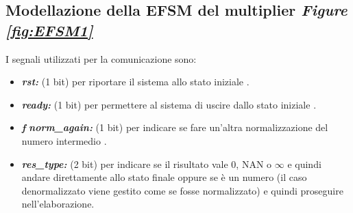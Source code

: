 \documentclass[]{IEEEtran}
\begin{document}
\subsection{Modellazione della EFSM del multiplier {\it Figure \ref{fig:EFSM1}}}
I segnali utilizzati per la comunicazione sono:
\begin{itemize}
    \item \textit{\textbf{rst:}} (1 bit) per riportare il sistema allo stato iniziale .
    \item {\it\bf ready:} (1 bit) per permettere al sistema di uscire dallo stato iniziale .
    \item \textbf{\textit{f}} {\it {\bf norm\_again:} } (1 bit) per indicare se fare un'altra normalizzazione del numero intermedio .
    \item {\it\bf res\_type:} (2 bit) per indicare se il risultato vale 0, NAN o \(\infty\) e quindi andare direttamente allo stato finale oppure se è un numero (il caso denormalizzato viene gestito come se fosse normalizzato) e quindi proseguire nell'elaborazione.
\end{itemize}
\end{document}

